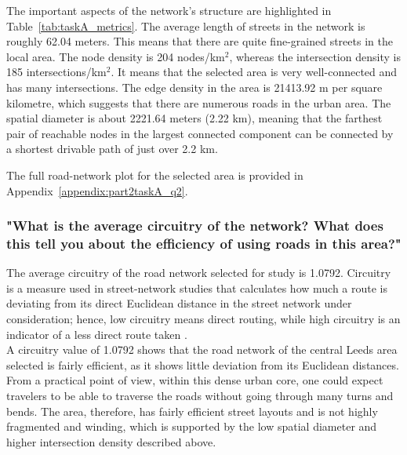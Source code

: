 \documentclass[acmsmall,nonacm,natbib=false]{acmart}
\begin{document}
The important aspects of the network's structure are highlighted in Table~\ref{tab:taskA_metrics}. The average length of streets in the network is roughly 62.04 meters. This means that there are quite fine-grained streets in the local area. The node density is 204  nodes/km$^2$, whereas the intersection density is 185 intersections/km$^2$. It means that the selected area is very well-connected and has many intersections. The edge density in the area is 21413.92 m per square kilometre, which suggests that there are numerous roads in the urban area. The spatial diameter is about 2221.64 meters (2.22 km), meaning that the farthest pair of reachable nodes in the largest connected component can be connected by a shortest drivable path of just over 2.2 km.


The full road-network plot for the selected area is provided in Appendix~\ref{appendix:part2taskA_q2}.

\subsubsection{\large\textbf{{"What is the average circuitry of the network? What does this tell you about the efficiency of using roads in this area?"}}} 
\leavevmode \par \noindent
The average circuitry of the road network selected for study is 1.0792. Circuitry is a measure used in street-network studies that calculates how much a route is deviating from its direct Euclidean distance in the street network under consideration; hence, low circuitry means direct routing, while high circuitry is an indicator of a less direct route taken \cite{boeing2017osmnx, okabe2000spatial}.\\
A circuitry value of 1.0792 shows that the road network of the central Leeds area selected is fairly efficient, as it shows little deviation from its Euclidean distances. From a practical point of view, within this dense urban core, one could expect travelers to be able to traverse the roads without going through many turns and bends. The area, therefore, has fairly efficient street layouts and is not highly fragmented and winding, which is supported by the low spatial diameter and higher intersection density described above.
\end{document}
